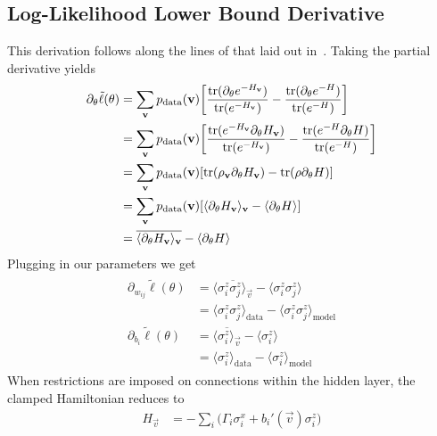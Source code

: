 \subsection{Log-Likelihood Lower Bound Derivative}\label{app:qbm_log_likelihood_lower_bound_derivative}
This derivation follows along the lines of that laid out in~\cite{amin_2018}.
Taking the partial derivative yields
\begin{align}
\begin{split}
    \label{eq:qbm_log_likelihood_derivative_lower_bound}
    \partial_\theta \tilde{\ell}(\theta)
        &= \sum_{\mathbf{v}} p_{\text{data}}(\mathbf{v}) \bigg[ \frac{\text{tr}(\partial_\theta e^{-H_{\mathbf{v}}})}{\text{tr}(e^{-H_{\mathbf{v}}})} - \frac{\text{tr}(\partial_\theta e^{-H})}{\text{tr}(e^{-H})} \bigg] \\
        &= \sum_{\mathbf{v}} p_{\text{data}}(\mathbf{v}) \bigg[ \frac{\text{tr}(e^{-H_{\mathbf{v}}} \partial_\theta H_{\mathbf{v}})}{\text{tr}(e^{-H_{\mathbf{v}}})} - \frac{\text{tr}(e^{-H} \partial_\theta H)}{\text{tr}(e^{-H})} \bigg] \\
        &= \sum_{\mathbf{v}} p_{\text{data}}(\mathbf{v}) [ \text{tr}(\rho_{\mathbf{v}} \partial_\theta H_{\mathbf{v}}) - \text{tr}(\rho \partial_\theta H) ] \\
        &= \sum_{\mathbf{v}} p_{\text{data}}(\mathbf{v}) [ \langle \partial_\theta H_{\mathbf{v}} \rangle_{\mathbf{v}} - \langle \partial_\theta H \rangle ] \\
        &= \overline{\langle \partial_\theta H_{\mathbf{v}} \rangle_{\mathbf{v}}} - \langle \partial_\theta H \rangle
\end{split}
\end{align}
Plugging in our parameters we get
\begin{align}
\begin{split}
    \partial_{w_{ij}} \tilde{\ell}(\theta)
        &= \overline{\langle \sigma_i^z \sigma_j^z \rangle_\vec{v}} - \langle \sigma_i^z \sigma_j^z \rangle \\
        &= \langle \sigma_i^z \sigma_j^z \rangle_\text{data} - \langle \sigma_i^z \sigma_j^z \rangle_\text{model} \\
    \partial_{b_i} \tilde{\ell}(\theta)
        &= \overline{\langle \sigma_i^z \rangle_\vec{v}} - \langle \sigma_i^z \rangle \\
        &= \langle \sigma_i^z \rangle_\text{data} - \langle \sigma_i^z \rangle_\text{model}
\end{split}
\end{align}
When restrictions are imposed on connections within the hidden layer, the clamped Hamiltonian reduces to
\begin{align}
    H_\vec{v}
        &= -\sum_i \big(\Gamma_i \sigma_i^x + b_i'(\vec{v}) \sigma_i^z\big)
\end{align}
